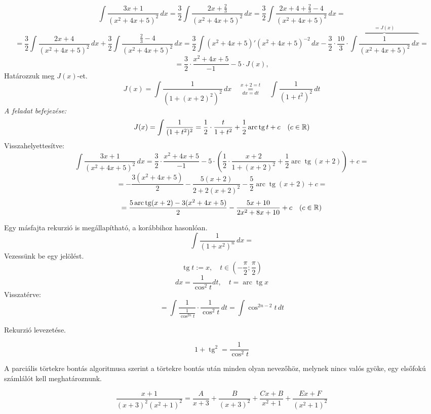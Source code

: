 \documentclass[a4paper,11.5pt]{article}
\DeclareMathOperator{\tg}{tg}
\DeclareMathOperator{\arc}{arc}
\begin{document}
	\begin{exercise}
		\[ \int\frac{3x+1}{(x^2+4x+5)^2}\,dx=\frac{3}{2}\int\frac{2x+\frac{2}{3}}{(x^2+4x+5)^2}\,dx=\frac{3}{2}\int\frac{2x+4+\frac{2}{3}-4}{(x^2+4x+5)^2}\,dx=\]
		\[=\frac{3}{2}\int\frac{2x+4}{(x^2+4x+5)^2}\,dx+\frac{3}{2}\int\frac{\frac{2}{3}-4}{(x^2+4x+5)^2}\,dx=\frac{3}{2}\int(x^2+4x+5)'(x^2+4x+5)^{-2}\,dx-\frac{3}{2}\cdot\frac{10}{3}\cdot\overbrace{\int\frac{1}{(x^2+4x+5)^2}\,dx}^{=J(x)}=\]
		\[=\frac{3}{2}\cdot\frac{x^2+4x+5}{-1}-5\cdot J(x), \]
		Határozzuk meg $J(x)$-et.
		\[J(x)=\int\frac{1}{(1+(x+2)^2)^2}\,dx\quad \overset{x+2=t}{\underset{dx=dt}{=}}\quad \int\frac{1}{(1+t^2)^2}\,dt\]
		\textit{A feladat befejezése:}
		\[ J(x) = \int\frac{1}{(1+t^2)^2}=\frac{1}{2}\cdot\frac{t}{1+t^2}+\frac{1}{2}\arc\tg t+c\quad (c\in\R) \]
		Visszahelyettesítve:
		\[\int\frac{3x+1}{(x^2+4x+5)^2}\,dx=\frac{3}{2}\cdot\frac{x^2+4x+5}{-1}-5\cdot\left(\frac{1}{2}\cdot\frac{x+2}{1+(x+2)^2}+\frac{1}{2}\arc\tg (x+2)\right)+c = \]
		\[ =-\frac{3(x^2+4x+5)}{2}-\frac{5(x+2)}{2+2(x+2)^2}-\frac{5}{2}\arc\tg(x+2) + c=\]
		\[=\frac{5\arc\tg(x+2)-3(x^2+4x+5)}{2}-\frac{5x+10}{2x^2+8x+10} + c \quad (c\in\R)\]
	\end{exercise}
	\begin{note}
		Egy másfajta rekurzió is megállapítható, a korábbihoz hasonlóan.
		\[ \int\frac{1}{(1+x^2)^n}\,dx= \]
		Vezessünk be egy jelölést.
		\[ \tg t:=x,\quad t\in\left(-\frac{\pi}{2};\frac{\pi}{2}\right) \]
		\[ dx=\frac{1}{\cos^2t}dt,\quad t=\arc\tg x \]
		Visszatérve:
		\[ =\int\frac{1}{\frac{1}{\cos^{2n}t}}\cdot\frac{1}{\cos^2t}\,dt=\int\cos^{2n-2}t\,dt \]
	\end{note}
	\begin{exercise}
		Rekurzió levezetése.
	\end{exercise}
	\begin{note}
		\[ 1+\tg^2=\frac{1}{\cos^2t} \]
	\end{note}
	\begin{note}
		A parciális törtekre bontás algoritmusa szerint a törtekre bontás után minden olyan nevezőhöz, melynek nincs valós gyöke, egy elsőfokú számlálót kell meghatároznunk.
	\end{note}
	\begin{task}
		\[ \frac{x+1}{(x+3)^2(x^2+1)^2}=\frac{A}{x+3}+\frac{B}{(x+3)^2}+\frac{Cx+B}{x^2+1}+\frac{Ex+F}{(x^2+1)^2} \]
	\end{task}
\end{document}
